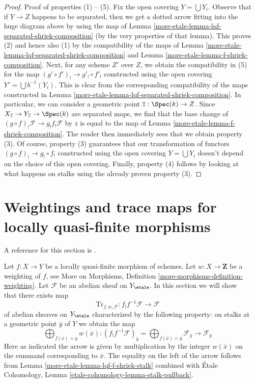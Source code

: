 \begin{proof}
\medskip\noindent
Proof of properties (1) -- (5). Fix the open covering $Y = \bigcup Y_i$.
Observe that if $Y \to Z$ happens to be separated, then we get a dotted
arrow fitting into the huge diagram above by using the map of
Lemma \ref{more-etale-lemma-lqf-separated-shriek-composition}
(by the very properties of that lemma).
This proves (2) and hence also (1) by the compatibility of the
maps of Lemma \ref{more-etale-lemma-lqf-separated-shriek-composition}
and Lemma \ref{more-etale-lemma-f-shriek-composition}.
Next, for any scheme $Z'$ over $Z$, we obtain the compatibility in (5)
for the map $(g' \circ f')_! \to g'_! \circ f'_!$
constructed using the open covering $Y' = \bigcup b^{-1}(Y_i)$.
This is clear from the corresponding compatibility of the maps
constructed in Lemma \ref{more-etale-lemma-lqf-separated-shriek-composition}.
In particular, we can consider a geometric point
$\overline{z} : \Spec(k) \to Z$. Since
$X_{\overline{z}} \to Y_{\overline{z}} \to \Spec(k)$
are separated maps, we find that the base change of
$(g \circ f)_!\mathcal{F} \to g_! f_! \mathcal{F}$
by $\overline{z}$ is equal to the map of
Lemma \ref{more-etale-lemma-f-shriek-composition}.
The reader then immediately sees that we obtain property (3).
Of course, property (3) guarantees that our transformation of functors
$(g \circ f)_! \to g_! \circ f_!$ constructed using the open covering
$Y = \bigcup Y_i$ doesn't depend on the choice of this open covering.
Finally, property (4) follows by looking at what happens on stalks
using the already proven property (3).
\end{proof}

\section{Weightings and trace maps for locally quasi-finite morphisms}
\label{more-etale-section-weightings}
A reference for this section is
\cite[Exposee XVII, Proposition 6.2.5]{SGA4}.

\medskip\noindent
Let $f : X \to Y$ be a locally quasi-finite morphism of schemes.
Let $w : X \to \mathbf{Z}$ be a weighting of $f$, see
More on Morphisms, Definition \ref{more-morphisms-definition-weighting}.
Let $\mathcal{F}$ be an abelian sheaf on $Y_\etale$.
In this section we will show that there exists map
$$
\text{Tr}_{f, w, \mathcal{F}} :
f_!f^{-1}\mathcal{F}
\longrightarrow
\mathcal{F}
$$
of abelian sheaves on $Y_\etale$ characterized by the following property:
on stalks at a geometric point $\overline{y}$ of $Y$ we obtain the map
$$
\bigoplus\nolimits_{f(\overline{x}) = \overline{y}} w(\overline{x}) :
(f_!f^{-1}\mathcal{F})_{\overline{y}} =
\bigoplus\nolimits_{f(\overline{x}) = \overline{y}}
\mathcal{F}_{\overline{y}}
\longrightarrow
\mathcal{F}_{\overline{y}}
$$
Here as indicated the arrow is given by multiplication by the integer
$w(\overline{x})$ on the summand corresponding to $\overline{x}$.
The equality on the left of the arrow follows from
Lemma \ref{more-etale-lemma-lqf-f-shriek-stalk} combined with
\'Etale Cohomology, Lemma \ref{etale-cohomology-lemma-stalk-pullback}.

